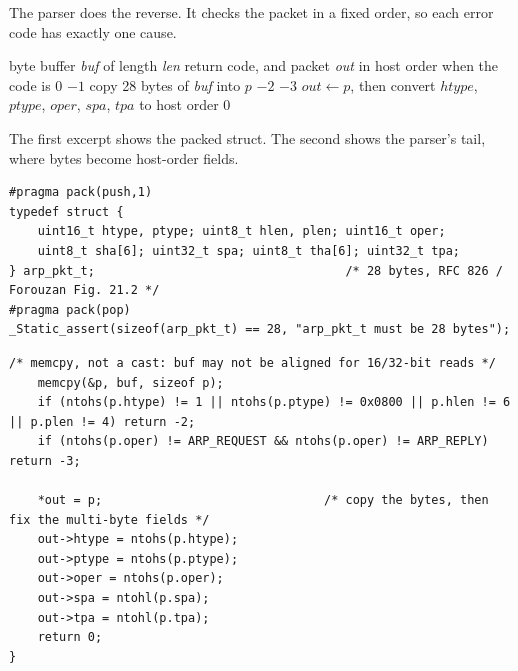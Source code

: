 The parser does the reverse. It checks the packet in a fixed order, so each error code has exactly one cause.

\begin{algorithm}[H]\small
\caption{Parse an ARP packet ()}
\label{alg:parse}
\begin{algorithmic}[1]
\Require byte buffer \textit{buf} of length \textit{len}
\Ensure return code, and packet \textit{out} in host order when the code is 0
 \Return $-1$ 
\EndIf
\State copy 28 bytes of \textit{buf} into $p$ 
 \Return $-2$ 
\EndIf
{} \Return $-3$ 
\EndIf
\State $out \gets p$, then convert $htype$, $ptype$, $oper$, $spa$, $tpa$ to host order
\State \Return $0$
\end{algorithmic}
\end{algorithm}

The first excerpt shows the packed struct. The second shows the parser's tail, where bytes become host-order fields.

\begin{lstlisting}[style=corelst, firstnumber=5, caption={\code{src/arp\_pkt.h}, lines 5--11: the packet struct.}]
#pragma pack(push,1)
typedef struct {
    uint16_t htype, ptype; uint8_t hlen, plen; uint16_t oper;
    uint8_t sha[6]; uint32_t spa; uint8_t tha[6]; uint32_t tpa;
} arp_pkt_t;                                   /* 28 bytes, RFC 826 / Forouzan Fig. 21.2 */
#pragma pack(pop)
_Static_assert(sizeof(arp_pkt_t) == 28, "arp_pkt_t must be 28 bytes");
\end{lstlisting}

\begin{lstlisting}[style=corelst, firstnumber=29, caption={\code{src/arp\_pkt.c}, lines 29--41: copy first, then convert.}]
    /* memcpy, not a cast: buf may not be aligned for 16/32-bit reads */
    memcpy(&p, buf, sizeof p);
    if (ntohs(p.htype) != 1 || ntohs(p.ptype) != 0x0800 || p.hlen != 6 || p.plen != 4) return -2;
    if (ntohs(p.oper) != ARP_REQUEST && ntohs(p.oper) != ARP_REPLY) return -3;

    *out = p;                               /* copy the bytes, then fix the multi-byte fields */
    out->htype = ntohs(p.htype);
    out->ptype = ntohs(p.ptype);
    out->oper = ntohs(p.oper);
    out->spa = ntohl(p.spa);
    out->tpa = ntohl(p.tpa);
    return 0;
}
\end{lstlisting}

